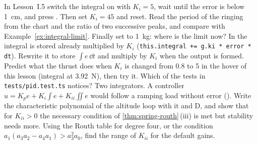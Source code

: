 \begin{exercises}
\exercise[2] In Lesson~I.5 switch the integral on with $K_i = 5$, wait until the error is below \SI{1}{cm}, and press . Then set $K_i = 45$ and reset. Read the period of the ringing from the chart and the ratio of two successive peaks, and compare with Example~\ref{ex:integral-limit}. Finally set  to \SI{1}{kg}: where is the limit now?
\exercise[2] In  the integral is stored already multiplied by $K_i$ (\texttt{this.integral += g.ki * error * dt}). Rewrite it to store $\int e\,\dd t$ and multiply by $K_i$ when the output is formed. Predict what the thrust does when $K_i$ is changed from 0.8 to 5 in the hover of this lesson (integral at \SI{3.92}{N}), then try it. Which of the tests in \texttt{tests/pid.test.ts} notices?
\exercise[3] Two integrators. A controller $u = K_p e + K_i\int e + K_{ii}\iint e$ would follow a ramping load without error (). Write the characteristic polynomial of the altitude loop with it and D, and show that for $K_{ii} > 0$ the necessary condition of \cref{thm:spring-routh}\,(iii) is met but stability needs more. Using the Routh table for degree four, or the condition $a_1(a_3a_2 - a_4a_1) > a_3^2a_0$, find the range of $K_{ii}$ for the default gains.
\end{exercises}

